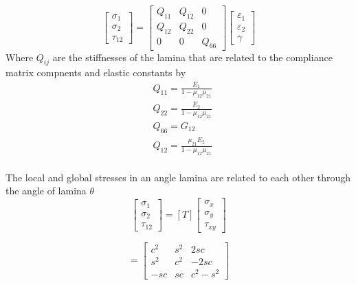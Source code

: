 \documentclass[smallextended]{svjour3}       %
\begin{document}
\begin{equation}
    \begin{bmatrix}
        \sigma_1\\
        \sigma_2\\
        \tau_{12}
    \end{bmatrix}
    =
    \begin{bmatrix}
        Q_{11} & Q_{12} & 0\\
        Q_{12} & Q_{22} & 0\\
        0 & 0 & Q_{66}
    \end{bmatrix}
    \begin{bmatrix}
        \varepsilon_1\\
        \varepsilon_2\\
        \gamma
    \end{bmatrix}
\end{equation}
Where $Q_{ij}$ are the stiffnesses of the lamina that are related to the compliance matrix
compnents and elastic constants by
\begin{equation}
    \begin{split}
    &Q_{11}=\frac{E_1}{1-\mu_{12}\mu_{21}}\\
    &Q_{22}=\frac{E_2}{1-\mu_{12}\mu_{21}}\\
    &Q_{66}=G_{12}\\
    &Q_{12}=\frac{\mu_{21}E_2}{1-\mu_{12}\mu_{21}}\\
    \end{split}
\end{equation}

The local and global stresses in an angle lamina are related to each other through the angle of
lamina $\theta$
\begin{equation}
	\left[\begin{array}{l}\sigma_{1} \\ \sigma_{2} \\ \tau_{12
			}\end{array}\right]=[T]\left[\begin{array}{l}\sigma_{x} \\ \sigma_{y} \\
	\tau_{xy}\end{array}\right]
\end{equation}

\begin{equation}
	[T]=\left[\begin{array}{ccc}c^{2} & s^{2} & 2 s c \\ s^{2} & c^{2} & -2 s c \\ -s c & s c &
	c^{2}-s^{2}\end{array}\right]
\end{equation}
\end{document}
